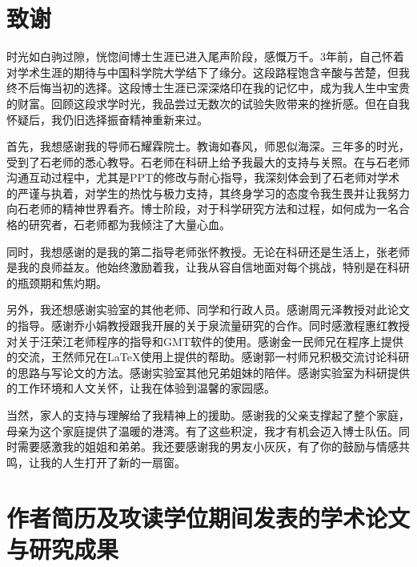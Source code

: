 \chapter[致谢]{致\quad 谢}

时光如白驹过隙，恍惚间博士生涯已进入尾声阶段，感慨万千。3年前，自己怀着对学术生涯的期待与中国科学院大学结下了缘分。这段路程饱含辛酸与苦楚，但我终不后悔当初的选择。这段博士生涯已深深烙印在我的记忆中，成为我人生中宝贵的财富。回顾这段求学时光，我品尝过无数次的试验失败带来的挫折感。但在自我怀疑后，我仍旧选择振奋精神重新来过。

首先，我想感谢我的导师石耀霖院士。教诲如春风，师恩似海深。三年多的时光，受到了石老师的悉心教导。石老师在科研上给予我最大的支持与关照。在与石老师沟通互动过程中，尤其是PPT的修改与耐心指导，我深刻体会到了石老师对学术的严谨与执着，对学生的热忱与极力支持，其终身学习的态度令我生畏并让我努力向石老师的精神世界看齐。博士阶段，对于科学研究方法和过程，如何成为一名合格的研究者，石老师都为我倾注了大量心血。

同时，我想感谢的是我的第二指导老师张怀教授。无论在科研还是生活上，张老师是我的良师益友。他始终激励着我，让我从容自信地面对每个挑战，特别是在科研的瓶颈期和焦灼期。

另外，我还想感谢实验室的其他老师、同学和行政人员。感谢周元泽教授对此论文的指导。感谢乔小娟教授跟我开展的关于泉流量研究的合作。同时感激程惠红教授对关于汪荣江老师程序的指导和GMT软件的使用。感谢金一民师兄在程序上提供的交流，王然师兄在\LaTeX{}使用上提供的帮助。感谢郭一村师兄积极交流讨论科研的思路与写论文的方法。感谢实验室其他兄弟姐妹的陪伴。感谢实验室为科研提供的工作环境和人文关怀，让我在体验到温馨的家园感。

当然，家人的支持与理解给了我精神上的援助。感谢我的父亲支撑起了整个家庭，母亲为这个家庭提供了温暖的港湾。有了这些积淀，我才有机会迈入博士队伍。同时需要感激我的姐姐和弟弟。我还要感谢我的男友小灰灰，有了你的鼓励与情感共鸣，让我的人生打开了新的一扇窗。


\chapter{作者简历及攻读学位期间发表的学术论文与研究成果}

